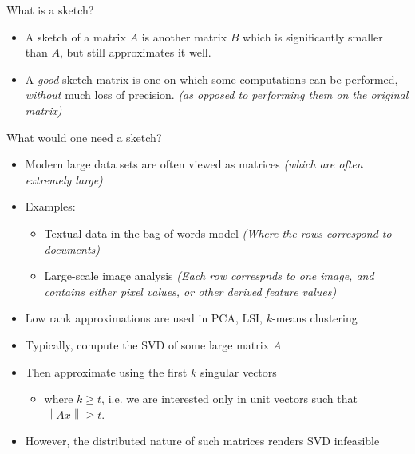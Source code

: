 \documentclass[first=dgreen,second=purple,logo=redque]{aaltoslides}
\newcommand{\vectornorm}[1]{\left\|#1\right\|}
\begin{document}




\begin{frame}{What is a sketch?}
\begin{itemize}
  \item A sketch of a matrix $A$ is another matrix $B$ which is significantly
  smaller than $A$, but still approximates it well.
  \item A \textit{good} sketch matrix is one on which some computations can
  be performed, \textit{without} much loss of precision.
   \emph{(as opposed to performing them on the original matrix)}
\end{itemize}
\end{frame}


\begin{frame}[allowframebreaks=1]{What would one need a sketch?}
\begin{itemize}
  \item Modern large data sets are often viewed as matrices
   \emph{(which are often extremely large)}
  \item{Examples:}
  \begin{itemize}
    \item Textual data in the bag-of-words model \emph{(Where the rows
    correspond to documents)}
    \item Large-scale image analysis \emph{(Each row correspnds to one image,
    and contains either pixel values, or other derived feature values)}
  \end{itemize}
  \item Low rank approximations are used in PCA, LSI, $k$-means clustering
\end{itemize}

\framebreak

\begin{itemize}
  \item Typically, compute the SVD of some large matrix $A$
  \item Then approximate using the first $k$ singular vectors
  \begin{itemize}
     \item where $k \geq t$, i.e. we are interested only in unit vectors such
     that $\vectornorm{Ax} \geq t$.
  \end{itemize}
  \item However, the distributed nature of such matrices renders SVD infeasible
\end{itemize}

\end{frame}
\end{document}
